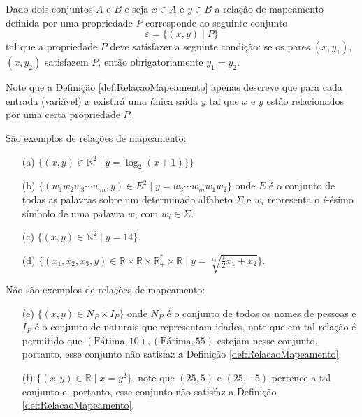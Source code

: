 \begin{definicao}\label{def:RelacaoMapeamento}
	Dado dois conjuntos $A$ e $B$ e seja $x \in A$ e $y \in B$ a relação de mapeamento definida por uma propriedade $P$ corresponde  ao seguinte conjunto 
	$$\varepsilon = \{(x, y)\mid P\}$$ 
  tal que a propriedade $P$ deve satisfazer a seguinte condição: se os pares $(x, y_1),$ $(x, y_2)$ satisfazem $P$, então obrigatoriamente $y_1 = y_2$.
\end{definicao}

Note que a Definição \ref{def:RelacaoMapeamento} apenas descreve que para cada entrada (variável) $x$ existirá uma única saída $y$ tal que $x$ e  $y$ estão relacionados por uma certa propriedade $P$.

\begin{exemplo}\label{exe:RelacaoConstrucao}
	São exemplos de relações de mapeamento:
	\begin{itemize}
		\item[(a)] $\{(x, y) \in \mathbb{R}^2 \mid y = \log_2(x + 1)\}\}$
		\item[(b)] $\{(w_1w_2w_3\cdots w_m, y) \in E^2 \mid y = w_3\cdots w_mw_1w_2\}$ onde $E$ é o conjunto de todas as palavras sobre um determinado alfabeto $\Sigma$ e $w_i$ representa o $i$-ésimo símbolo de uma palavra $w$, com $w_i \in \Sigma$.
		\item[(c)] $\{(x, y) \in \mathbb{N}^2 \mid y = 14\}$.
		\item[(d)] $\Big\{(x_1, x_2, x_3, y) \in \mathbb{R} \times \mathbb{R} \times \mathbb{R}^*_+ \times \mathbb{R} \mid y = \sqrt[x_3]{\displaystyle\frac{1}{2}x_1 + x_2}\Big\}$.
	\end{itemize}
	Não são exemplos de relações de mapeamento:
	\begin{itemize}
		\item[(e)] $\{(x, y) \in N_P \times I_P\}$ onde $N_P$ é o conjunto de todos os nomes de pessoas e $I_P$ é o conjunto de naturais que representam idades, note que em tal relação é permitido que $(\text{Fátima}, 10), (\text{Fátima}, 55)$ estejam nesse conjunto, portanto, esse conjunto não satisfaz a Definição \ref{def:RelacaoMapeamento}.
		\item[(f)] $\{(x, y) \in \mathbb{R}  \mid x = y^2\}$, note que $(25, 5)$ e $(25, -5)$ pertence a tal conjunto e, portanto, esse conjunto não satisfaz a Definição \ref{def:RelacaoMapeamento}.
	\end{itemize}
\end{exemplo}

